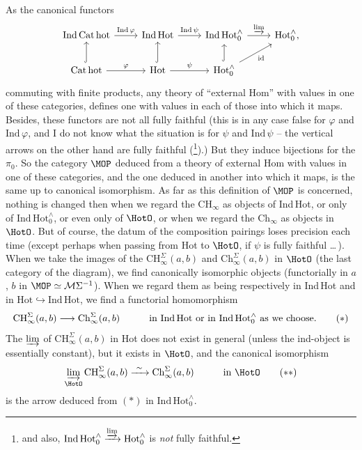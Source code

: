 As the canonical functors
\[
\begin{tikzcd}
\mathrm{Ind\,Cat\,hot} \arrow[r, "\mathrm{Ind}\,\varphi"] & \mathrm{Ind\,Hot} \arrow[r, "\mathrm{Ind}\,\psi"] & \mathrm{Ind\,Hot}_0^{\wedge} \arrow[r, "\varinjlim"] & \mathrm{Hot}_0^{\wedge},\\
\mathrm{Cat\,hot} \arrow[u, hook] \arrow[r, "\varphi"] & \mathrm{Hot} \arrow[u, hook] \arrow[r, "\psi"] & \mathrm{Hot}_0^{\wedge} \arrow[u, hook] \arrow[ur, "\mathrm{id}"'] &
\end{tikzcd}
\]
commuting with finite products, any theory of ``external Hom'' with values in one of these categories, defines one with values in each of those into which it maps.
Besides, these functors are not all fully faithful (this is in any case false for $\varphi$ and $\mathrm{Ind}\,\varphi$, and I do not know what the situation is for $\psi$ and $\mathrm{Ind}\,\psi$ -- the vertical arrows on the other hand are fully faithful (\footnote[3]{and also, $\mathrm{Ind\,Hot}_0^{\wedge}\xrightarrow{\varinjlim}\mathrm{Hot}_0^{\wedge}$ is \textit{not} fully faithful.}).) But they induce bijections for the $\pi_0$. So the category $\MOP$ deduced from a theory of external Hom with values in one of these categories, and the one %
deduced in another into which it maps, is the same up to canonical isomorphism. As far as this definition of $\MOP$ is concerned, nothing is changed then when we regard the $\mathrm{CH}_{\infty}$ as objects of Ind\,Hot, or only of $\mathrm{Ind\,Hot}_0^{\wedge}$, or even only of $\HotO$, or when we regard the $\mathrm{Ch}_{\infty}$ as objects
in $\HotO$. But of course, the datum of the composition pairings loses precision each time (except perhaps when passing from Hot to $\HotO$, if $\psi$ is fully faithful \dots\,). When we take the images of the $\mathrm{CH}^{\Sigma}_{\infty}(a,b)$ and $\mathrm{Ch}^{\Sigma}_{\infty}(a,b)$ in $\HotO$ (the last category of the diagram), we find canonically isomorphic objects (functorially in $a$, $b$ in $\MOP\simeq\mathcal{M}\Sigma^{-1}$). When we regard them as being respectively in Ind\,Hot and in $\mathrm{Hot}\hookrightarrow\mathrm{Ind\,Hot}$, we find a functorial homomorphism
\[
\mathrm{CH}^{\Sigma}_{\infty}(a,b)\longrightarrow\mathrm{Ch}^{\Sigma}_{\infty}(a,b) \qquad\quad \text{in Ind\,Hot or in } \mathrm{Ind\,Hot}_0^{\wedge} \text{ as we choose.} \tag*{$(*)$}
\]
The $\varinjlim$ of $\mathrm{CH}^{\Sigma}_{\infty}(a,b)$ in Hot does not exist in general (unless the ind-object is essentially constant), but it exists in $\HotO$, and the canonical isomorphism
\[
\varinjlim_{\HotO}\mathrm{CH}^{\Sigma}_{\infty}(a,b)\xrightarrow{\ \sim\ }\mathrm{Ch}^{\Sigma}_{\infty}(a,b) \qquad\quad \text{in } \HotO \tag*{$(**)$}
\]
is the arrow deduced from $(*)$ in $\mathrm{Ind\,Hot}_0^{\wedge}$.

